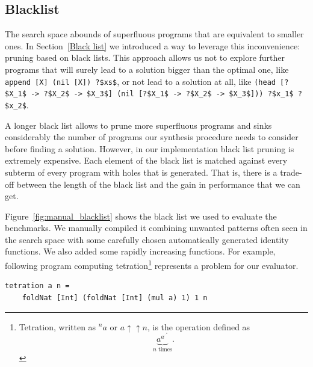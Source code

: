 \subsection{Blacklist}
The search space abounds of superfluous programs that are equivalent to smaller ones. In Section~\ref{Black list} we introduced a way to leverage this inconvenience: pruning based on black lists. This approach allows us not to explore further programs that will surely lead to a solution bigger than the optimal one, like \lstinline!append [X] (nil [X]) ?$xs$!, or not lead to a solution at all, like \lstinline!(head [?$X_1$ -> ?$X_2$ -> $X_3$] (nil [?$X_1$ -> ?$X_2$ -> $X_3$])) ?$x_1$ ?$x_2$!.

A longer black list allows to prune more superfluous programs and sinks considerably the number of programs our synthesis procedure needs to consider before finding a solution. However, in our implementation black list pruning is extremely expensive. Each element of the black list is matched against every subterm of every program with holes that is generated. That is, there is a trade-off between the length of the black list and the gain in performance that we can get.

Figure~\ref{fig:manual_blacklist} shows the black list  we used to evaluate the benchmarks. We manually compiled it combining unwanted patterns often seen in the search space with some carefully chosen automatically generated identity functions. We also added some rapidly increasing functions. For example, following program computing tetration\footnote{Tetration, written as $^{n}a$ or $a \uparrow\uparrow n$, is the operation defined as \[\underbrace{a^{a^{.^{.^a}}}}_{n \text{ times}}.\]} represents a problem for our evaluator.
\begin{lstlisting}[style=plain]
tetration a n =
    foldNat [Int] (foldNat [Int] (mul a) 1) 1 n
\end{lstlisting}


